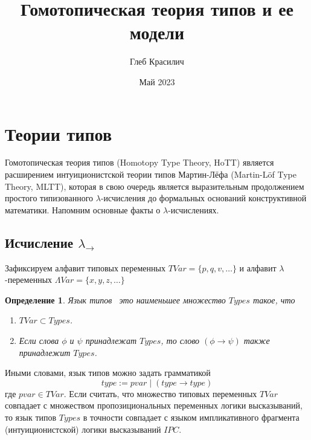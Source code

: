 \documentclass{article}[12pt]
\title{Гомотопическая теория типов и ее модели}
\author{Глеб Красилич}
\date{Май 2023}
\newtheorem{definition}{Определение}
\newcommand{\dash}{\textemdash\ }
\begin{document}
\maketitle

\section{Теории типов}

Гомотопическая теория типов (Homotopy Type Theory, HoTT) является расширением интуиционистской теории типов
Мартин-Лёфа (Martin-Löf Type Theory, MLTT), которая в свою очередь является выразительным
продолжением простого типизованного $\lambda$-исчисления до формальных оснований конструктивной математики.
Напомним основные факты о $\lambda$-исчислениях.

\subsection{Исчисление $\lambda_\rightarrow$}

Зафиксируем алфавит типовых переменных $TVar = \{p, q, v, \dots \}$ и алфавит $\lambda$-переменных
$\Lambda Var = \{x, y, z, \dots \}$
\begin{definition}
    Язык типов \dash это наименьшее множество $Types$ такое, что
    \begin{enumerate}
        \item $TVar \subset Types$.
        \item Если слова $\phi$ и $\psi$ принадлежат $Types$, то слово $(\phi \rightarrow \psi)$
        также принадлежит $Types$.
    \end{enumerate}
\end{definition}
Иными словами, язык типов можно задать грамматикой
$$type := pvar \; | \; (type \rightarrow type)$$
где $pvar \in TVar$. Если считать, что множество типовых переменных $TVar$ совпадает с множеством
пропозициональных переменных логики высказываний, то язык типов $Types$ в точности совпадает с
языком импликативного фрагмента (интуиционистской) логики высказываний $IPC$.  
\end{document}

